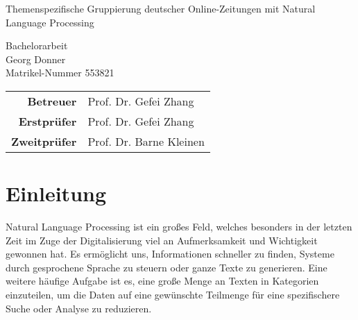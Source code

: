 
\pagestyle{empty} %

\clearscrheadings\clearscrplain
\begin{center}
\begin{Huge}
Themenspezifische Gruppierung deutscher Online-Zeitungen mit Natural Language Processing\\
\end{Huge}

\vspace{8mm}
Bachelorarbeit\\
\vspace{0.4cm}
\vspace{2 cm}
Georg Donner\\
Matrikel-Nummer 553821\\
\vspace{8cm}
\begin{tabular}{rl}
{\bfseries Betreuer} & Prof. Dr. Gefei Zhang\\
{\bfseries Erstprüfer} & Prof. Dr. Gefei Zhang\\
{\bfseries Zweitprüfer} & Prof. Dr. Barne Kleinen\\
\end{tabular}

\end{center}
\clearpage

\pagestyle{useheadings} %

\tableofcontents %
\listoffigures %
\listoftables %
\clearpage

\chapter{Einleitung}
Natural Language Processing ist ein großes Feld, welches besonders in der letzten Zeit im Zuge der Digitalisierung viel an Aufmerksamkeit und Wichtigkeit gewonnen hat. Es ermöglicht uns, Informationen schneller zu finden, Systeme durch gesprochene Sprache zu steuern oder ganze Texte zu generieren. Eine weitere häufige Aufgabe ist es, eine große Menge an Texten in Kategorien einzuteilen, um die Daten auf eine gewünschte Teilmenge für eine spezifischere Suche oder Analyse zu reduzieren.

